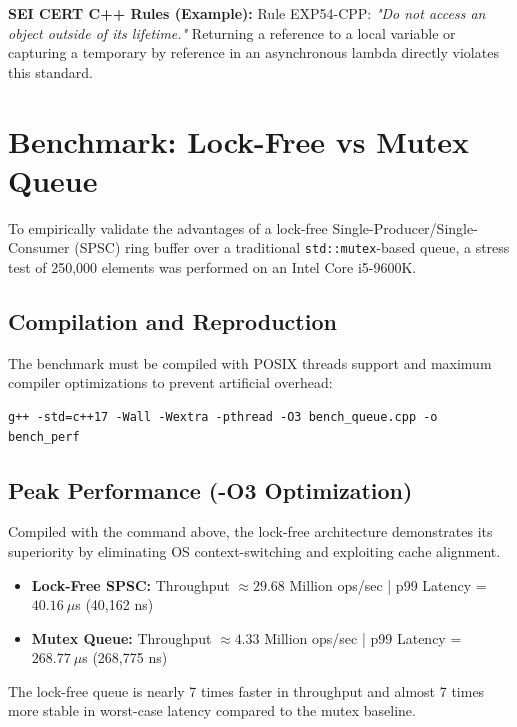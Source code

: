\documentclass{article}
\begin{document}
\textbf{SEI CERT C++ Rules (Example):}
Rule EXP54-CPP: \textit{"Do not access an object outside of its lifetime."} Returning a reference to a local variable or capturing a temporary by reference in an asynchronous lambda directly violates this standard.

\section{Benchmark: Lock-Free vs Mutex Queue}
To empirically validate the advantages of a lock-free Single-Producer/Single-Consumer (SPSC) ring buffer over a traditional \texttt{std::mutex}-based queue, a stress test of 250,000 elements was performed on an Intel Core i5-9600K. 

\subsection{Compilation and Reproduction}
The benchmark must be compiled with POSIX threads support and maximum compiler optimizations to prevent artificial overhead:
\begin{verbatim}
g++ -std=c++17 -Wall -Wextra -pthread -O3 bench_queue.cpp -o bench_perf
\end{verbatim}

\subsection{Peak Performance (-O3 Optimization)}
Compiled with the command above, the lock-free architecture demonstrates its superiority by eliminating OS context-switching and exploiting cache alignment.
\begin{itemize}
    \item \textbf{Lock-Free SPSC:} Throughput $\approx 29.68$ Million ops/sec | p99 Latency = $40.16\ \mu$s (40,162 ns)
    \item \textbf{Mutex Queue:} Throughput $\approx 4.33$ Million ops/sec | p99 Latency = $268.77\ \mu$s (268,775 ns)
\end{itemize}
The lock-free queue is nearly 7 times faster in throughput and almost 7 times more stable in worst-case latency compared to the mutex baseline.
\end{document}
